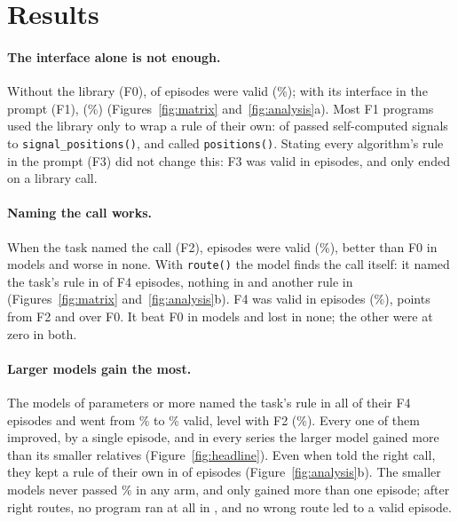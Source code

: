 \section{Results}
\label{sec:results}

\paragraph{The interface alone is not enough.}
Without the library (F0), \FixFZeroValid{} of \FixArm{} episodes were valid (\FixFZeroPct\%); with
its interface in the prompt (F1), \FixFOneValid{} (\FixFOnePct\%) (Figures~\ref{fig:matrix}
and~\ref{fig:analysis}a). Most F1 programs used the library only to wrap a rule of their own:
\FixFOneUsesSignalPositions{} of \FixFOnePrograms{} passed self-computed signals to
\texttt{signal\_positions()}, and \FixFOneUsesPositions{} called \texttt{positions()}. Stating
every algorithm's rule in the prompt (F3) did not change this: F3 was valid in \FixFThreeValid{}
episodes, and only \FixFThreeLastCalls{} ended on a library call.

\paragraph{Naming the call works.}
When the task named the call (F2), \FixFTwoValid{} episodes were valid (\FixFTwoPct\%), better than
F0 in \FixFTwoMinusFZeroBetter{} models and worse in none. With \texttt{route()} the model finds
the call itself: it named the task's rule in \FixRouteRight{} of \FixArm{} F4 episodes, nothing
in \FixRouteNone{} and another rule in \FixRouteWrong{} (Figures~\ref{fig:matrix}
and~\ref{fig:analysis}b). F4 was valid in \FixFFourValid{} episodes (\FixFFourPct\%),
\FixFFourMinusFTwo{} points from F2 and \FixFFourMinusFZero{} over F0. It beat F0 in
\FixFFourMinusFZeroBetter{} models and lost in none; the other \FixFFourSameAtZero{} were at
zero in both.

\paragraph{Larger models gain the most.}
The \FixLargeModels{} models of \FixSizeCut{} parameters or more named the task's rule in all
\FixLargeRouteRight{} of their F4 episodes and went from \FixLargeFZeroPct\% to
\FixLargeFFourPct\% valid, level with F2 (\FixLargeFTwoPct\%). Every one of them improved,
\FixLargeFFourByOne{} by a single episode, and in every series the larger model gained more than
its smaller relatives (Figure~\ref{fig:headline}). Even when told the right call, they kept a
rule of their own in \FixLargeFFourToldOwn{} of \FixLargeFFourTold{} episodes
(Figure~\ref{fig:analysis}b). The \FixSmallModels{} smaller models never passed
\FixSmallMaxPct\% in any arm, and only \texttt{\FixSmallGainModel} gained more than one episode;
after \FixSmallFFourTold{} right routes, no program ran at all in \FixSmallFFourToldNoProgram,
and no wrong route led to a valid episode.

